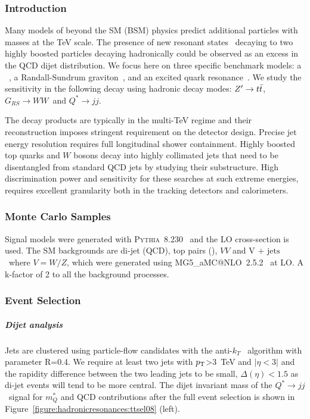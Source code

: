 \documentclass{cernrep}
\newcommand*{\zptt}{\ensuremath{Z^{\prime} \rightarrow \ttbar}}
\newcommand*{\qjj}{\ensuremath{Q^{*} \rightarrow jj}}
\newcommand*{\rsg}{\ensuremath{G_{RS} \rightarrow WW}}
\newcommand*{\vj}{\ensuremath{\text{V + jets}}}
\begin{document}
\subsubsection{Introduction}
Many models of beyond the SM (BSM) physics predict additional particles with masses at the TeV scale. The presence of new resonant states~\cite{Harris:2011bh,Boelaert:2009jm,Lee:1973iz,Branco:2011iw,Hill:1994hp,Kaplan:1983sm,Bellazzini:2014yua,Randall:1999ee,Pomarol:1999ad} decaying to two highly boosted particles decaying hadronically could be observed as an excess in the QCD dijet distribution. We focus here on three specific benchmark models: a \ZpSSM~\cite{Langacker:2008yv}, a Randall-Sundrum graviton~\cite{Randall:1999ee}, and an excited quark resonance~\cite{Baur:1987ga,Baur:1989kv}. We study the sensitivity in the following decay using hadronic decay modes: \zptt, \rsg\ and \qjj.

The decay products are typically in the multi-TeV regime and their reconstruction imposes stringent requirement on the detector design. Precise jet energy resolution requires full longitudinal shower containment. Highly boosted top quarks and $W$ bosons decay into highly collimated jets that need to  be disentangled from standard QCD jets by studying their substructure. High discrimination power and sensitivity for these searches at such extreme energies, requires excellent granularity both in the tracking detectors and calorimeters.

\subsubsection{Monte Carlo Samples}
Signal models were generated with {\scshape Pythia}~8.230~\cite{Sjostrand:2014zea} and the LO cross-section is used. The SM backgrounds are di-jet (QCD), top pairs (\ttbar), $VV$ and \vj\ where $V=W/Z$, which were generated using {\scshape MG5\_}a{\scshape MC@NLO}~2.5.2~\cite{Alwall:2014} at LO. A k-factor of 2 to all the background processes.

\subsubsection{Event Selection}

\subparagraph{Dijet analysis}

Jets are clustered using particle-flow candidates with the anti-$k_T$~\cite{Cacciari:2008gp} algorithm with parameter R=0.4. We require at least two jets with $p_{\text{T}}$>3~TeV and $|\eta<3|$ and the rapidity difference between the two leading jets to be small, $\Delta(\eta)<1.5$ as di-jet events will tend to be more central. The dijet invariant mass of the \qjj\ signal for $m_Q^{*}$ and QCD contributions after the full event selection is shown in Figure~\ref{figure:hadronicresonances:ttsel08} (left).
\end{document}
